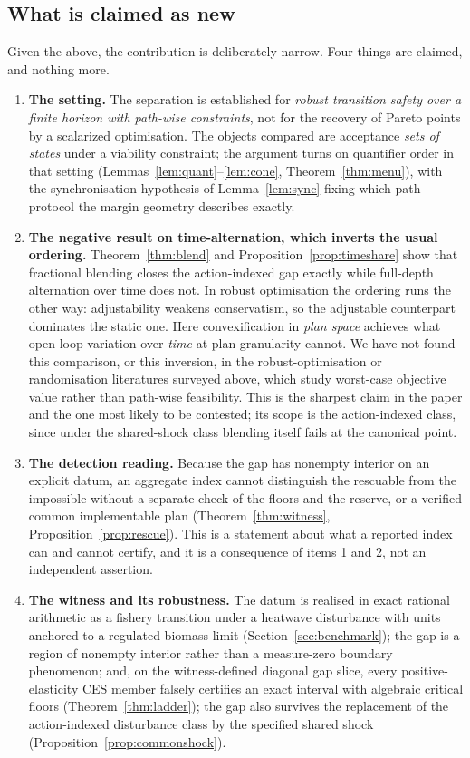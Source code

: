 \documentclass[preprint,11pt,authoryear]{elsarticle}
\theoremstyle{definition}
\theoremstyle{remark}
\begin{document}
\subsection{What is claimed as new}\label{sec:whatisnew}

Given the above, the contribution is deliberately narrow. Four things are claimed, and nothing more.
\begin{enumerate}[leftmargin=2em]
\item \textbf{The setting.} The separation is established for \emph{robust transition safety over a finite horizon with path-wise constraints}, not for the recovery of Pareto points by a scalarized optimisation. The objects compared are acceptance \emph{sets of states} under a viability constraint; the argument turns on quantifier order in that setting (Lemmas~\ref{lem:quant}--\ref{lem:cone}, Theorem~\ref{thm:menu}), with the synchronisation hypothesis of Lemma~\ref{lem:sync} fixing which path protocol the margin geometry describes exactly.
\item \textbf{The negative result on time-alternation, which inverts the usual ordering.} Theorem~\ref{thm:blend} and Proposition~\ref{prop:timeshare} show that fractional blending closes the action-indexed gap exactly while full-depth alternation over time does not. In robust optimisation the ordering runs the other way: adjustability weakens conservatism, so the adjustable counterpart dominates the static one. Here convexification in \emph{plan space} achieves what open-loop variation over \emph{time} at plan granularity cannot. We have not found this comparison, or this inversion, in the robust-optimisation or randomisation literatures surveyed above, which study worst-case objective value rather than path-wise feasibility. This is the sharpest claim in the paper and the one most likely to be contested; its scope is the action-indexed class, since under the shared-shock class blending itself fails at the canonical point.
\item \textbf{The detection reading.} Because the gap has nonempty interior on an explicit datum, an aggregate index cannot distinguish the rescuable from the impossible without a separate check of the floors and the reserve, or a verified common implementable plan (Theorem~\ref{thm:witness}, Proposition~\ref{prop:rescue}). This is a statement about what a reported index can and cannot certify, and it is a consequence of items 1 and 2, not an independent assertion.
\item \textbf{The witness and its robustness.} The datum is realised in exact rational arithmetic as a fishery transition under a heatwave disturbance with units anchored to a regulated biomass limit (Section~\ref{sec:benchmark}); the gap is a region of nonempty interior rather than a measure-zero boundary phenomenon; and, on the witness-defined diagonal gap slice, every positive-elasticity CES member falsely certifies an exact interval with algebraic critical floors (Theorem~\ref{thm:ladder}); the gap also survives the replacement of the action-indexed disturbance class by the specified shared shock (Proposition~\ref{prop:commonshock}).
\end{enumerate}
\end{document}
